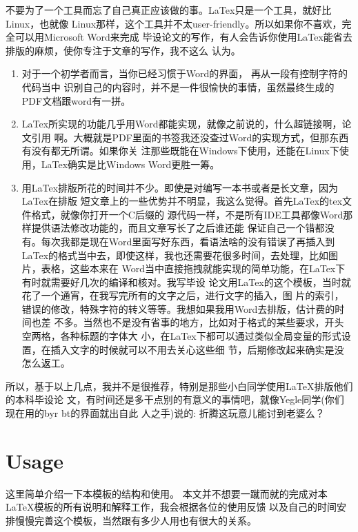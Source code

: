 \documentclass[a4paper,oneside,xetex]{ctexbook}
\begin{document}
不要为了一个工具而忘了自己真正应该做的事。LaTex只是一个工具，就好比Linux，也就像
Linux那样，这个工具并不太user-friendly。所以如果你不喜欢，完全可以用Microsoft Word来完成
毕设论文的写作，有人会告诉你使用LaTex能省去排版的麻烦，使你专注于文章的写作，我不这么
认为。
\begin{enumerate}
\item  对于一个初学者而言，当你已经习惯于Word的界面， 再从一段有控制字符的代码当中
识别自己的内容时，并不是一件很愉快的事情，虽然最终生成的PDF文档跟word有一拼。
\item LaTex所实现的功能几乎用Word都能实现，就像之前说的，什么超链接啊，论文引用
啊。大概就是PDF里面的书签我还没查过Word的实现方式，但那东西有没有都无所谓。如果你关
注那些既能在Windows下使用，还能在Linux下使用，LaTex确实是比Windows Word更胜一筹。
\item 用LaTex排版所花的时间并不少。即使是对编写一本书或者是长文章，因为LaTex在排版
短文章上的一些优势并不明显，我这么觉得。首先LaTex的tex文件格式，就像你打开一个C后缀的
源代码一样，不是所有IDE工具都像Word那样提供语法修改功能的，而且文章写长了之后谁还能
保证自己一个错都没有。每次我都是现在Word里面写好东西，看语法啥的没有错误了再插入到
LaTex的格式当中去，即使这样，我也还需要花很多时间，去处理，比如图片，表格，这些本来在
Word当中直接拖拽就能实现的简单功能，在LaTex下有时就需要好几次的编译和核对。我写毕设
论文用LaTex的这个模板，当时就花了一个通宵，在我写完所有的文字之后，进行文字的插入，图
片的索引，错误的修改，特殊字符的转义等等。我想如果我用Word去排版，估计费的时间也差
不多。当然也不是没有省事的地方，比如对于格式的某些要求，开头空两格，各种标题的字体大
小，在LaTex下都可以通过类似全局变量的形式设置，在插入文字的时候就可以不用去关心这些细
节，后期修改起来确实是没怎么返工。
\end{enumerate}
所以，基于以上几点，我并不是很推荐，特别是那些小白同学使用LaTeX排版他们的本科毕设论
文，有时间还是多干点别的有意义的事情吧，就像Yegle同学(你们现在用的byr bt的界面就出自此
人之手)说的: 折腾这玩意儿能讨到老婆么？

\section{Usage}
这里简单介绍一下本模板的结构和使用。
本文并不想要一蹴而就的完成对本LaTeX模板的所有说明和解释工作，我会根据各位的使用反馈
以及自己的时间安排慢慢完善这个模板，当然跟有多少人用也有很大的关系。
\end{document}
